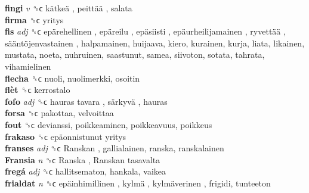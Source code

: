 \textbf{fingi} \emph{v}  ␝ϲ   kätkeä ,  peittää , salata  \\
\textbf{firma} ␝ϲ  yritys  \\
\textbf{fis} \emph{adj}  ␝ϲ   epärehellinen ,  epäreilu ,  epäsiisti ,  epäurheilijamainen ,  ryvettää ,  sääntöjenvastainen , halpamainen, huijaava, kiero, kurainen, kurja, liata, likainen, mustata, noeta, nuhruinen, saastunut, samea, siivoton, sotata, tahrata, vihamielinen  \\
\textbf{flecha} ␝ϲ  nuoli, nuolimerkki, osoitin  \\
\textbf{flèt} ␝ϲ  kerrostalo  \\
\textbf{fofo} \emph{adj}  ␝ϲ   hauras tavara ,  särkyvä , hauras  \\
\textbf{forsa} ␝ϲ  pakottaa, velvoittaa  \\
\textbf{fout} ␝ϲ  devianssi, poikkeaminen, poikkeavuus, poikkeus  \\
\textbf{frakaso} ␝ϲ   epäonnistunut yritys   \\
\textbf{franses} \emph{adj}  ␝ϲ   Ranskan , gallialainen, ranska, ranskalainen  \\
\textbf{Fransia} \emph{n}  ␝ϲ   Ranska ,  Ranskan tasavalta   \\
\textbf{fregá} \emph{adj}  ␝ϲ  hallitsematon, hankala, vaikea  \\
\textbf{frialdat} \emph{n}  ␝ϲ   epäinhimillinen ,  kylmä ,  kylmäverinen , frigidi, tunteeton  \\
